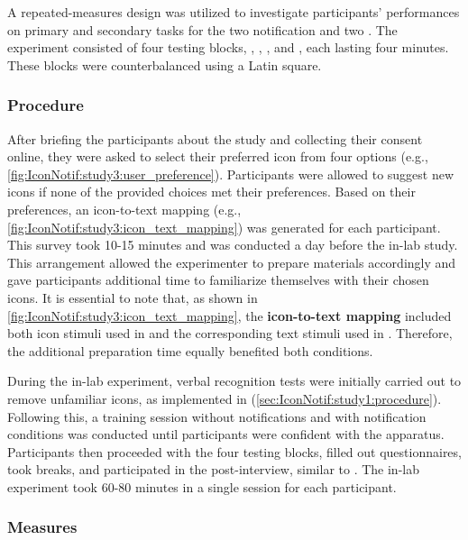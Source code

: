 A repeated-measures design was utilized to investigate participants' performances on primary and secondary tasks for the two notification  and two \complexities{}. The experiment consisted of four testing blocks, \textsingle{}, \textmulti{}, \iconsingle{}, and \iconmulti{}, each lasting four minutes. These blocks were counterbalanced using a Latin square.


\subsubsection*{Procedure}
\label{sec:IconNotif:study3:procedure}

After briefing the participants about the study and collecting their consent online, they were asked to select their preferred icon from four options (e.g., \autoref{fig:IconNotif:study3:user_preference}). Participants were allowed to suggest new icons if none of the provided choices met their preferences. Based on their preferences, an icon-to-text mapping (e.g., \autoref{fig:IconNotif:study3:icon_text_mapping}) was generated for each participant. This survey took 10-15 minutes and was conducted a day before the in-lab study. This arrangement allowed the experimenter to prepare materials accordingly and gave participants additional time to familiarize themselves with their chosen icons.
It is essential to note that, as shown in \autoref{fig:IconNotif:study3:icon_text_mapping}, the \textbf{icon-to-text mapping} included both icon stimuli used in  and the corresponding text stimuli used in . Therefore, the additional preparation time equally benefited both conditions.

During the in-lab experiment, verbal recognition tests were initially carried out to remove unfamiliar icons, as implemented in \studyone{} (\autoref{sec:IconNotif:study1:procedure}). Following this, a training session without notifications and with \singlecomplexity{} notification conditions was conducted until participants were confident with the apparatus. Participants then proceeded with the four testing blocks, filled out questionnaires, took breaks, and participated in the post-interview, similar to \studyone{}. The in-lab experiment took 60-80 minutes in a single session for each participant.

\subsubsection*{Measures}
\label{sec:IconNotif:study2:measures}

